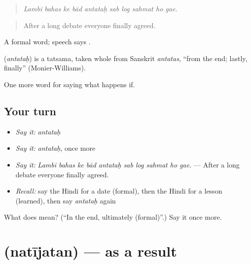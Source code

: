 \begin{quote}
         
\end{quote}

\begin{quote}
\emph{Lambī bahas ke bād antataḥ sab log sahmat ho gae.}
\end{quote}

\begin{quote}
After a long debate everyone finally agreed.
\end{quote}

A formal word; speech says  .

\begin{cousinweb}
\textbf{} (\emph{antataḥ}) is a tatsama, taken whole from Sanskrit \emph{antatas}, \textquotedblleft{}from the end; lastly, finally\textquotedblright{} (Monier-Williams).
\end{cousinweb}

\begin{grammarlens}[title={What you've built}]
One more word for saying what happens if.
\end{grammarlens}

\subsection*{Your turn}
\begin{itemize}
\raggedright
  \item \emph{Say it:} \emph{antataḥ}
  \item \emph{Say it:} \emph{antataḥ}, once more
  \item \emph{Say it:} \emph{Lambī bahas ke bād antataḥ sab log sahmat ho gae.} — After a long debate everyone finally agreed.
  \item \emph{Recall:} say the Hindi for a date (formal), then the Hindi for a lesson (learned), then say \emph{antataḥ} again
\end{itemize}

\begin{tcolorbox}[breakable,colback=teal!4,colframe=teal!35!black,title={Before you move on}]
What does  mean? (\textquotedblleft{}In the end, ultimately (formal)\textquotedblright{}.) Say it once more.
\end{tcolorbox}
\section[\texorpdfstring{\hi{नतीजतन} (natījatan)}{नतीजतन (natījatan)}]{ (natījatan) — as a result}

